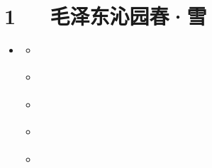 \documentclass[letterpaper,12pt,english]{sphinxmanual}
\begin{document}
\chapter{1   毛泽东\sphinxhyphen{}沁园春·雪}
\label{\detokenize{p01_u6563_u6587/_u6bdb_u6cfd_u4e1c-_u6c81_u56ed_u6625_xb7_u96ea:id1}}\label{\detokenize{p01_u6563_u6587/_u6bdb_u6cfd_u4e1c-_u6c81_u56ed_u6625_xb7_u96ea::doc}}
\begin{sphinxShadowBox}
\begin{itemize}
\item {} 
\label{\detokenize{p01_u6563_u6587/_u6bdb_u6cfd_u4e1c-_u6c81_u56ed_u6625_xb7_u96ea:id8}}{\hyperref[\detokenize{p01_u6563_u6587/_u6bdb_u6cfd_u4e1c-_u6c81_u56ed_u6625_xb7_u96ea:id1}]{}}
\begin{itemize}
\item {} 
\label{\detokenize{p01_u6563_u6587/_u6bdb_u6cfd_u4e1c-_u6c81_u56ed_u6625_xb7_u96ea:id9}}{\hyperref[\detokenize{p01_u6563_u6587/_u6bdb_u6cfd_u4e1c-_u6c81_u56ed_u6625_xb7_u96ea:id3}]{}}

\item {} 
\label{\detokenize{p01_u6563_u6587/_u6bdb_u6cfd_u4e1c-_u6c81_u56ed_u6625_xb7_u96ea:id10}}{\hyperref[\detokenize{p01_u6563_u6587/_u6bdb_u6cfd_u4e1c-_u6c81_u56ed_u6625_xb7_u96ea:id4}]{}}

\item {} 
\label{\detokenize{p01_u6563_u6587/_u6bdb_u6cfd_u4e1c-_u6c81_u56ed_u6625_xb7_u96ea:id11}}{\hyperref[\detokenize{p01_u6563_u6587/_u6bdb_u6cfd_u4e1c-_u6c81_u56ed_u6625_xb7_u96ea:id5}]{}}

\item {} 
\label{\detokenize{p01_u6563_u6587/_u6bdb_u6cfd_u4e1c-_u6c81_u56ed_u6625_xb7_u96ea:id12}}{\hyperref[\detokenize{p01_u6563_u6587/_u6bdb_u6cfd_u4e1c-_u6c81_u56ed_u6625_xb7_u96ea:id6}]{}}

\item {} 
\label{\detokenize{p01_u6563_u6587/_u6bdb_u6cfd_u4e1c-_u6c81_u56ed_u6625_xb7_u96ea:id13}}{\hyperref[\detokenize{p01_u6563_u6587/_u6bdb_u6cfd_u4e1c-_u6c81_u56ed_u6625_xb7_u96ea:id7}]{}}

\end{itemize}

\end{itemize}
\end{sphinxShadowBox}
\end{document}
